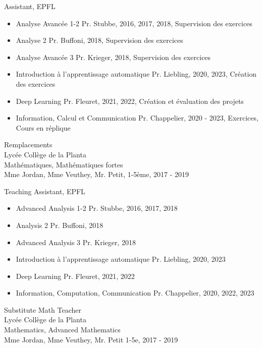 \ifFrench

  \color{deepgray}
  \large Assistant, EPFL
  \color{mediumgray} \small
  \begin{itemize}
    \item \color{deepgray}Analyse Avancée 1-2 \color{mediumgray} Pr. Stubbe, 2016, 2017, 2018, Supervision des exercices
    \item \color{deepgray}Analyse 2 \color{mediumgray} Pr. Buffoni, 2018, Supervision des exercices
    \item \color{deepgray}Analyse Avancée 3 \color{mediumgray} Pr. Krieger, 2018, Supervision des exercices
    \item \color{deepgray}Introduction à l'apprentissage automatique  \color{mediumgray} Pr. Liebling, 2020, 2023, Création des exercices
    \item \color{deepgray}Deep Learning \color{mediumgray} Pr. Fleuret, 2021, 2022, Création et évaluation des projets
    \item \color{deepgray}Information, Calcul et Communication \color{mediumgray} Pr. Chappelier, 2020 - 2023, Exercices, Cours en réplique
  \end{itemize}

  \commonvspace
  \color{deepgray}
  \large Remplacements \\
  \color{mediumgray} \small
  Lycée Collège de la Planta \\
  Mathématiques, Mathématiques fortes \\
  Mme Jordan, Mme Veuthey, Mr. Petit,
  1-5ème, 2017 - 2019 \\

\else

  \color{deepgray}
  \large Teaching Assistant, EPFL
  \color{mediumgray} \small
  \begin{itemize}
    \item \color{deepgray}Advanced Analysis 1-2  \color{mediumgray} Pr. Stubbe, 2016, 2017, 2018
    \item \color{deepgray}Analysis 2  \color{mediumgray} Pr. Buffoni, 2018
    \item \color{deepgray}Advanced Analysis 3  \color{mediumgray} Pr. Krieger, 2018
    \item \color{deepgray}Introduction à l'apprentissage automatique  \color{mediumgray} Pr. Liebling, 2020, 2023
    \item \color{deepgray}Deep Learning  \color{mediumgray} Pr. Fleuret, 2021, 2022
    \item \color{deepgray}Information, Computation, Communication  \color{mediumgray} Pr. Chappelier, 2020, 2022, 2023
  \end{itemize}

  \commonvspace
  \color{deepgray}
  \large Substitute Math Teacher \\
  \color{mediumgray} \small
  Lycée Collège de la Planta \\
  Mathematics, Advanced Mathematics \\
  Mme Jordan, Mme Veuthey, Mr. Petit
  1-5e, 2017 - 2019
\fi